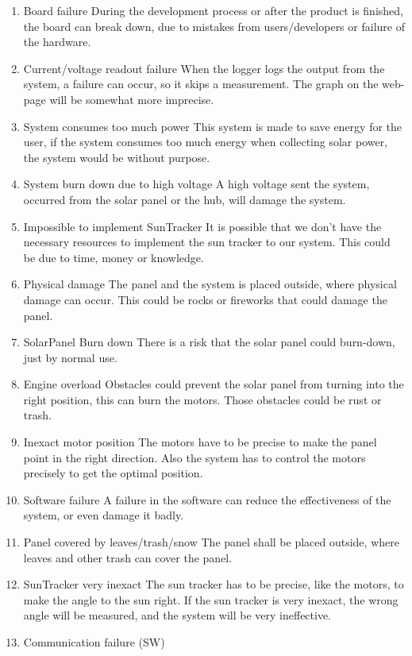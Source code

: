 \documentclass[12pt,a4paper]{report}
\begin{document}
\begin{enumerate}
\item Board failure
\subitem During the development process or after the product is finished, the board can break down, due to mistakes from users/developers or failure of the hardware. 
\item Current/voltage readout failure
\subitem When the logger logs the output from the system, a failure can occur, so it skips a measurement. The graph on the web-page will be somewhat more imprecise. 
\item System consumes too much power
\subitem This system is made to save energy for the user, if the system consumes too much energy when collecting solar power, the system would be without purpose. 
\item System burn down due to high voltage
\subitem A high voltage sent the system, occurred from the solar panel or the hub, will damage the system. 
\item Impossible to implement SunTracker
\subitem It is possible that we don’t have the necessary resources to implement the sun tracker to our system. This could be due to time, money or knowledge. 
\item Physical damage
\subitem The panel and the system is placed outside, where physical damage can occur. This could be rocks or fireworks that could damage the panel. 
\item SolarPanel Burn down
\subitem There is a risk that the solar panel could burn-down, just by normal use. 
\item Engine overload
\subitem Obstacles could prevent the solar panel from turning into the right position, this can burn the motors. Those obstacles could be rust or trash. 
\item Inexact motor position
\subitem The motors have to be precise to make the panel point in the right direction. Also the system has to control the motors precisely to get the optimal position. 
\item Software failure
\subitem A failure in the software can reduce the effectiveness of the system, or even damage it badly. 
\item Panel covered by leaves/trash/snow
\subitem The panel shall be placed outside, where leaves and other trash can cover the panel. 
\item SunTracker very inexact
\subitem The sun tracker has to be precise, like the motors, to make the angle to the sun right. If the sun tracker is very inexact, the wrong angle will be measured, and the system will be very ineffective. 
\item Communication failure (SW)

\end{enumerate}
\end{document}
